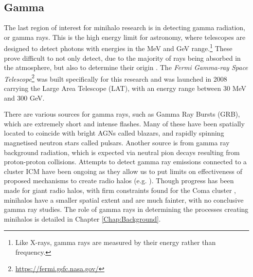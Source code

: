 \subsection{Gamma}

The last region of interest for minihalo research is in detecting gamma radiation, or gamma rays. This is the high energy limit for astronomy, where telescopes are designed to detect photons with energies in the MeV and GeV range.\footnote{Like X-rays, gamma rays are measured by their energy rather than frequency.} These prove difficult to not only detect, due to the majority of rays being absorbed in the atmosphere, but also to determine their origin \citep{Schneider2015}. The \textit{Fermi Gamma-ray Space Telescope}\footnote{\url{https://fermi.gsfc.nasa.gov/}} was built specifically for this research and was launched in 2008 carrying the Large Area Telescope (LAT), with an energy range between 30 MeV and 300 GeV. 

There are various sources for gamma rays, such as Gamma Ray Bursts (GRB), which are extremely short and intense flashes. Many of these have been spatially located to coincide with bright AGNs called blazars, and rapidly spinning magnetised neutron stars called pulsars. Another source is from gamma ray background radiation, which is expected via neutral pion decays resulting from proton-proton collisions. Attempts to detect gamma ray emissions connected to a cluster ICM have been ongoing as they allow us to put limits on effectiveness of proposed mechanisms to create radio halos (e.g. \citealp{Reimer2003,Ackermann2010,ZandanelGamma2014}). Though progress has been made for giant radio halos, with firm constraints found for the Coma cluster \citep{Brunetti2012}, minihalos have a smaller spatial extent and are much fainter, with no conclusive gamma ray studies. The role of gamma rays in determining the processes creating minihalos is detailed in Chapter \ref{Chap:Background}.

